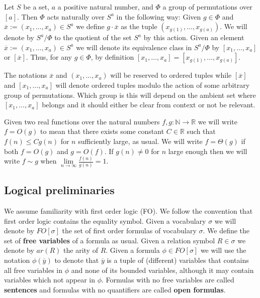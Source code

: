 \documentclass[12pt,notitlepage,a4paper]{article}
\theoremstyle{definition}
\newcommand{\R}{\mathbb{R}}
\newcommand{\N}{\mathbb{N}}
\newcommand{\Ln}{\lim\limits_{n\to \infty}}
\begin{document}
Let $S$ be a set, $a$ a positive natural number, 
and $\Phi$ a group of permutations over 
$[a]$. Then $\Phi$ acts naturally over
$S^a$ in the following way: Given $g\in \Phi$ and
$\overline{x}:=(x_1,\dots,x_a)\in S^a$ we define 
$g\cdot \overline{x}$ 
as the tuple $(x_{g(1)},\dots,x_{g(a)})$. 
We will denote by $S^a/\Phi$ to the quotient
of the set $S^a$ by this action. Given an element
$\overline{x}:=(x_1,\dots, x_a)\in S^a$ we will denote its equivalence
class in $S^a/\Phi$ by $[x_1,\dots,x_a]$ or $[\overline{x}]$.
Thus, for any
$g\in \Phi$, by definition $[x_1,\dots,x_a]=[x_{g(1)}
,\dots,x_{g(a)}]$. \par
The notations $\overline{x}$ and
$(x_1,\dots, x_a)$ 
will be reserved 
to ordered tuples while 
$[\overline{x}]$ and
$[x_1,\dots,x_a]$ will denote ordered tuples modulo the
action of some arbitrary group of permutations. Which group is
this will depend on the ambient set where $[x_1,\dots,x_a]$ belongs
and it should either be clear from context or not be relevant.\par

Given two real functions over the natural numbers 
$f,g:\N \rightarrow \R$ we will write $f=O(g)$ to 
mean that there exists some constant $C\in \R$
such that $f(n)\leq Cg(n)$ for $n$ sufficiently large, 
as usual. We will write $f=\Theta(g)$ if both $f=O(g)$ and
$g=O(f)$. If $g(n)\neq 0$ for $n$ large enough then
we will write $f\sim g$ when $\Ln \frac{f(n)}{g(n)}=1$. 




\subsection{Logical preliminaries}
We assume familiarity with first order logic (FO). We follow 
the convention that first order logic contains the equality symbol. 
Given a vocabulary $\sigma$ we will denote by $FO[\sigma]$ the set of 
first order formulas of vocabulary $\sigma$. We define the set of 
\textbf{free variables} of a formula as usual. 
Given a relation symbol $R\in \sigma$ we denote by $ar(R)$ the arity of $R$. 
Given a formula $\phi\in FO[\sigma]$ we will use the notation $\phi(\overline{y})$ 
to denote that $\overline{y}$ is a tuple of 
(different) variables that contains all free variables in $\phi$ and
none of its bounded variables, although it may contain variables
which not appear in $\phi$.
Formulas with no free variables are called \textbf{sentences} and 
formulas with no quantifiers are called \textbf{open formulas}. 
\end{document}
